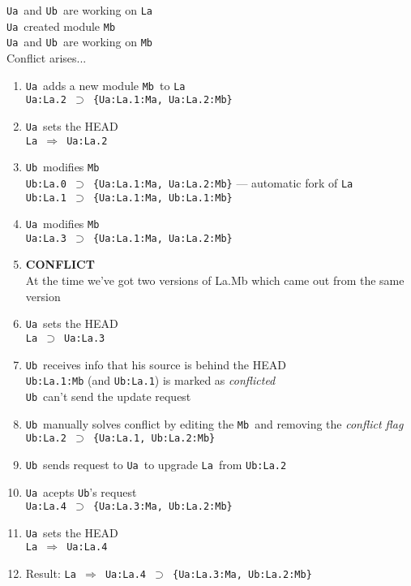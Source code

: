 \documentclass[10pt]{article}
\def\Ua{{\tt Ua}}
\def\Ub{{\tt Ub}}
\def\La{{\tt La}}
\def\Mb{{\tt Mb}}
\def\headsto{${\Longrightarrow}$ }
\def\hto{\headsto}
\def\eq{${\supset}$ }
\begin{document}
		\Ua\ and \Ub\ are working on \La\\ 
		\Ua\ created module \Mb\\
		\Ua\ and \Ub\ are working on \Mb\\
		Conflict arises...

		\begin{enumerate}
			\item{\Ua\ adds a new module \Mb\ to \La\\
            		{\tt Ua:La.2 \eq \{Ua:La.1:Ma, Ua:La.2:Mb\}}
			}
			\item{\Ua\ sets the HEAD\\
				{\tt La \hto Ua:La.2}
			}
			\item{\Ub\ modifies \Mb\\
				{\tt Ub:La.0 \eq \{Ua:La.1:Ma, Ua:La.2:Mb\}} --- automatic fork of \La\\
				{\tt Ub:La.1 \eq \{Ua:La.1:Ma, Ub:La.1:Mb\}}
			}
			\item{\Ua\ modifies \Mb\\
				{\tt Ua:La.3 \eq \{Ua:La.1:Ma, Ua:La.2:Mb\}}
			}
			\item{{\bf CONFLICT}\\
            		At the time we've got two versions of La.Mb which came out from the same version
            	}
            	\item{\Ua\ sets the HEAD\\
            		{\tt La \eq Ua:La.3}
            	}
            	\item{\Ub\ receives info that his source is behind the HEAD\\
				{\tt Ub:La.1:Mb} (and {\tt Ub:La.1}) is marked as {\em conflicted}\\
				\Ub\ can't send the update request
			}
			\item{\Ub\ manually solves conflict by editing the \Mb\ and removing the {\em conflict flag}\\
				{\tt Ub:La.2 \eq \{Ua:La.1, Ub:La.2:Mb\}}
			}
			\item{\Ub\ sends request to \Ua\ to upgrade \La\ from {\tt Ub:La.2}}
			\item{\Ua\ acepts \Ub's request\\
				{\tt Ua:La.4 \eq \{Ua:La.3:Ma, Ub:La.2:Mb\}}
			}
			\item{\Ua\ sets the HEAD\\
				{\tt La \hto Ua:La.4}
			}
			\item{Result: {\tt La \hto Ua:La.4 \eq \{Ua:La.3:Ma, Ub:La.2:Mb\}}}
		\end{enumerate}
		
\end{document}
